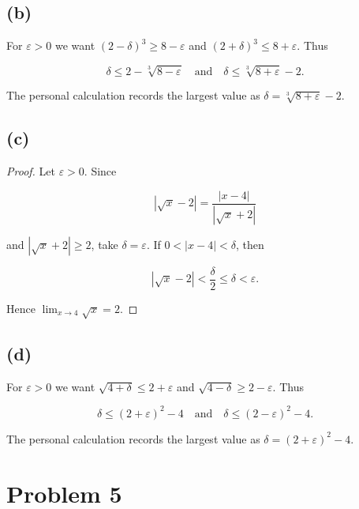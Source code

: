 \subsection{(b)}

For \(\varepsilon > 0\) we want \(\left( {2 - \delta} \right)^{3} \geq 8 - \varepsilon\) and \(\left( {2 + \delta} \right)^{3} \leq 8 + \varepsilon\). Thus

\[\delta \leq 2 - \sqrt[3]{8 - \varepsilon}\quad\text{and}\quad\delta \leq \sqrt[3]{8 + \varepsilon} - 2.\]

The personal calculation records the largest value as \(\delta = \sqrt[3]{8 + \varepsilon} - 2\).

\subsection{(c)}

\begin{proof}

Let \(\varepsilon > 0\). Since

\[\left| {\sqrt{x} - 2} \right| = \frac{\left| {x - 4} \right|}{\left| {\sqrt{x} + 2} \right|}\]

and \(\left| {\sqrt{x} + 2} \right| \geq 2\), take \(\delta = \varepsilon\). If \(0 < \left| {x - 4} \right| < \delta\), then

\[\left| {\sqrt{x} - 2} \right| < \frac{\delta}{2} \leq \delta < \varepsilon.\]

Hence \(\lim_{x\rightarrow 4}\sqrt{x} = 2\).

\end{proof}

\subsection{(d)}

For \(\varepsilon > 0\) we want \(\sqrt{4 + \delta} \leq 2 + \varepsilon\) and \(\sqrt{4 - \delta} \geq 2 - \varepsilon\). Thus

\[\delta \leq \left( {2 + \varepsilon} \right)^{2} - 4\quad\text{and}\quad\delta \leq \left( {2 - \varepsilon} \right)^{2} - 4.\]

The personal calculation records the largest value as \(\delta = \left( {2 + \varepsilon} \right)^{2} - 4\).

\section{Problem 5}

